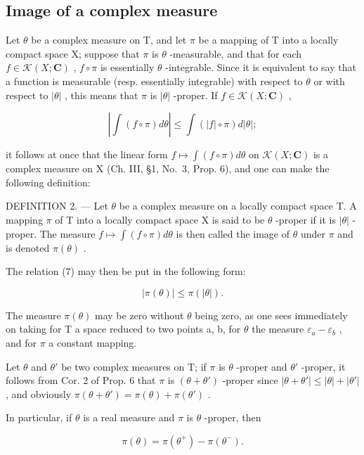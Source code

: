 \subsection{Image of a complex measure}

Let \(\theta\) be a complex measure on T, and let \(\pi\) be a mapping of T into a locally compact space X; suppose that \(\pi\) is \(\theta\) -measurable, and that for each \(f \in \mathcal{K}(X; \mathbf{C})\) , \(f \circ \pi\) is essentially \(\theta\) -integrable. Since it is equivalent to say that a function is measurable (resp. essentially integrable) with respect to \(\theta\) or with respect to \(|\theta|\) , this means that \(\pi\) is \(|\theta|\) -proper. If \(f \in \mathcal{K}(X; \mathbf{C})\) ,

\[
\left| \int (f \circ \pi) d \theta \right| \leqslant \int (| f | \circ \pi) d | \theta |;\tag{7}
\]

it follows at once that the linear form \(f \mapsto \int(f \circ \pi) d\theta\) on \(\mathcal{K}(X; \mathbf{C})\) is a complex measure on X (Ch. III, §1, No.~3, Prop. 6), and one can make the following definition:

DEFINITION 2. --- Let \(\theta\) be a complex measure on a locally compact space T. A mapping \(\pi\) of T into a locally compact space X is said to be \(\theta\) -proper if it is \(|\theta|\) -proper. The measure \(f \mapsto \int(f \circ \pi) d\theta\) is then called the image of \(\theta\) under \(\pi\) and is denoted \(\pi(\theta)\) .

The relation (7) may then be put in the following form:

\[
| \pi (\theta) | \leqslant \pi (| \theta |).\tag{8}
\]

The measure \(\pi(\theta)\) may be zero without \(\theta\) being zero, as one sees immediately on taking for T a space reduced to two points a, b, for \(\theta\) the measure \(\varepsilon_{a} - \varepsilon_{b}\) , and for \(\pi\) a constant mapping.

Let \(\theta\) and \(\theta'\) be two complex measures on T; if \(\pi\) is \(\theta\) -proper and \(\theta'\) -proper, it follows from Cor. 2 of Prop. 6 that \(\pi\) is \((\theta + \theta')\) -proper since \(|\theta + \theta'| \leqslant |\theta| + |\theta'|\) , and obviously \(\pi(\theta + \theta') = \pi(\theta) + \pi(\theta')\) .

In particular, if \(\theta\) is a real measure and \(\pi\) is \(\theta\) -proper, then

\[
\pi (\theta) = \pi (\theta^ {+}) - \pi (\theta^ {-}).\tag{9}
\]

